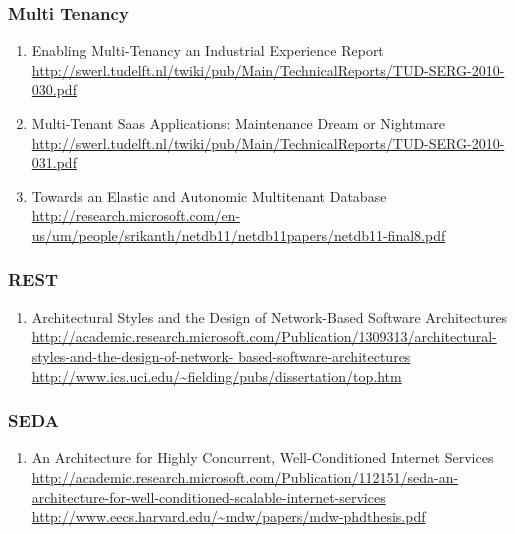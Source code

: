 \documentclass{article}
\begin{document}
\subsubsection{Multi Tenancy}
\begin{enumerate}
	\item {Enabling Multi-Tenancy an Industrial Experience Report\\
\href{http://swerl.tudelft.nl/twiki/pub/Main/TechnicalReports/TUD-SERG-2010-030.pdf}{http://swerl.tudelft.nl/twiki/pub/Main/TechnicalReports/TUD-SERG-2010-030.pdf}}
	\item {Multi-Tenant Saas Applications: Maintenance Dream or Nightmare\\
\href{http://swerl.tudelft.nl/twiki/pub/Main/TechnicalReports/TUD-SERG-2010-031.pdf}{http://swerl.tudelft.nl/twiki/pub/Main/TechnicalReports/TUD-SERG-2010-031.pdf}}
	\item {Towards an Elastic and Autonomic Multitenant Database\\ \url{http://research.microsoft.com/en-us/um/people/srikanth/netdb11/netdb11papers/netdb11-final8.pdf}}
\end{enumerate}

\subsubsection{REST}
\begin{enumerate}
	\item {Architectural Styles and the Design of Network-Based Software Architectures\\
\href{http://academic.research.microsoft.com/Publication/1309313/architectural-styles-and-the-design-of-network-
	based-software-architectures}{http://academic.research.microsoft.com/Publication/1309313/architectural-styles-and-the-design-of-network-
	based-software-architectures}\\
\url{http://www.ics.uci.edu/~fielding/pubs/dissertation/top.htm}}
\end{enumerate}

\subsubsection{SEDA}
\begin{enumerate}
	\item {An Architecture for Highly Concurrent, Well-Conditioned Internet Services\\
\href{http://academic.research.microsoft.com/Publication/112151/seda-an-architecture-for-well-conditioned-scalable-internet-services}{http://academic.research.microsoft.com/Publication/112151/seda-an-architecture-for-well-conditioned-scalable-internet-services}\\
\url{http://www.eecs.harvard.edu/~mdw/papers/mdw-phdthesis.pdf}}
\end{enumerate}
\end{document}
